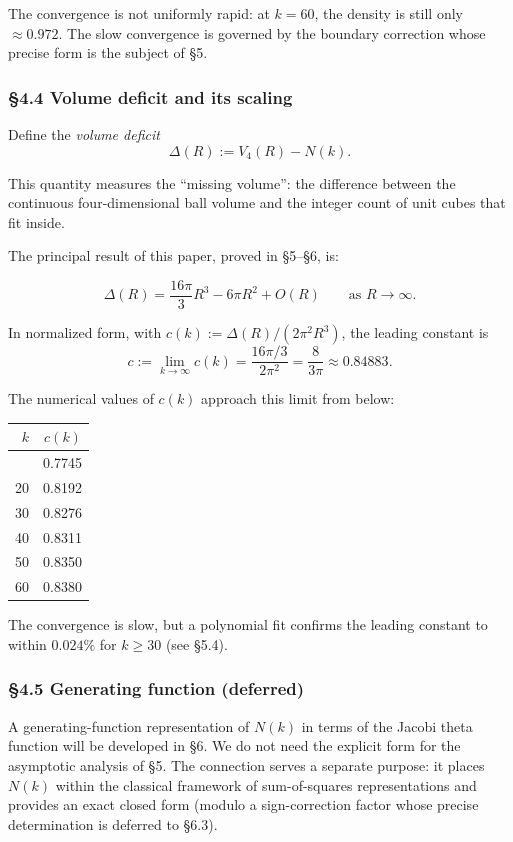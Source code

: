\documentclass[a4paper,11pt]{article}
\theoremstyle{definition}
\begin{document}
The convergence is not uniformly rapid: at \(k = 60\), the density is
still only \(\approx 0.972\). The slow convergence is governed by the
boundary correction whose precise form is the subject of §5.

\subsubsection{§4.4 Volume deficit and its
scaling}\label{volume-deficit-and-its-scaling}

Define the \emph{volume deficit} \[\Delta(R) := V_4(R) - N(k).\]

This quantity measures the ``missing volume'': the difference between
the continuous four-dimensional ball volume and the integer count of
unit cubes that fit inside.

The principal result of this paper, proved in §5--§6, is:

\[\Delta(R) = \frac{16\pi}{3} R^3 - 6\pi R^2 + O(R) \qquad \text{as } R \to \infty.\]

In normalized form, with \(c(k) := \Delta(R) / (2\pi^2 R^3)\), the
leading constant is
\[\boxed{\;c := \lim_{k \to \infty} c(k) = \frac{16\pi/3}{2\pi^2} = \frac{8}{3\pi} \approx 0.84883.\;}\]

The numerical values of \(c(k)\) approach this limit from below:

{\def\LTcaptype{none} %
\begin{longtable}[]{@{}rr@{}}
\toprule\noalign{}
\(k\) & \(c(k)\) \\
\midrule\noalign{}
\endhead
\bottomrule\noalign{}
\endlastfoot
10 & 0.7745 \\
20 & 0.8192 \\
30 & 0.8276 \\
40 & 0.8311 \\
50 & 0.8350 \\
60 & 0.8380 \\
\end{longtable}
}

The convergence is slow, but a polynomial fit confirms the leading
constant to within \(0.024\%\) for \(k \ge 30\) (see §5.4).

\subsubsection{§4.5 Generating function
(deferred)}\label{generating-function-deferred}

A generating-function representation of \(N(k)\) in terms of the Jacobi
theta function will be developed in §6. We do not need the explicit form
for the asymptotic analysis of §5. The connection serves a separate
purpose: it places \(N(k)\) within the classical framework of
sum-of-squares representations and provides an exact closed form (modulo
a sign-correction factor whose precise determination is deferred to
§6.3).
\end{document}
